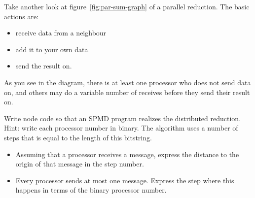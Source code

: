   Take another look at figure~\ref{fig:par-sum-graph} of a parallel
  reduction. The basic actions are:
  \begin{itemize}
  \item receive data from a neighbour
  \item add it to your own data
  \item send the result on.
  \end{itemize}
  As you see in the diagram, there is at least one processor who does
  not send data on, and others may do a variable number of receives
  before they send their result on.

  Write node code so that an \ac{SPMD} program realizes the
  distributed reduction. Hint: write each processor number in
  binary. The algorithm uses a number of steps that is equal to the
  length of this bitstring.
  \begin{itemize}
  \item Assuming that a processor receives a message, express the
    distance to the origin of that message in the step number.
  \item Every processor sends at most one message. Express the step
    where this happens in terms of the binary processor number.
  \end{itemize}
